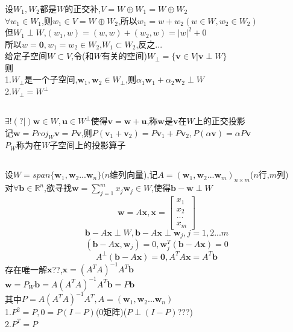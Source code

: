 \documentclass[11pt, a4paper, UTF8]{ctexart}
\begin{document}
\subsubsection{}
设$W_1,W_2$都是$W$的正交补,$V=W\oplus W_1=W\oplus W_2$\\
$\forall w_1\in W_1$,则$w_1\in V=W\oplus W_2$,所以$w_1=w+w_2(w\in W,w_2\in W_2)$\\
但$W_1\perp W$,$(w_1,w)=(w,w)+(w_2,w)=|w|^2+0$\\
所以$w=\bm0,w_1=w_2\in W_2$,$W_1\subset W_2$,反之...\\
给定子空间$W\subset V$,令(和$W$有关的空间)$W_\perp=\{\bm v\in V|\bm v\perp W\}$\\
则\\
1.$W_\perp$是一个子空间,$\bm w_1,\bm w_2\in W_\perp$,则$\alpha_1\bm w_1+\alpha_2\bm w_2\perp W$\\
2.$W_\perp=W^\perp$\\
\subsection{}
$\exists!(?|)\bm w\in W,\bm u\in W^\perp$使得$\bm v=\bm w+\bm u$,称$\bm w$是$\bm v$在$W$上的正交投影\\
记$\bm w=Proj_W\bm v=P\bm v$,则$P(\bm v_1+\bm v_2)=P\bm v_1+P\bm v_2,P(\alpha\bm v)=\alpha P\bm v$\\
$P_W$称为在$W$子空间上的投影算子\\
\subsection{}
设$W=span\{\bm w_1,\bm w_2...\bm w_n\}(n$维列向量),记$A=(\bm w_1,\bm w_2...\bm w_m)_{n\times m}$($n$行,$m$列)\\
对$\forall\bm b\in\mathbb{R}^n$,欲寻找$\bm w=\sum_{j=1}^mx_j\bm w_j\in W$,使得$\bm b-\bm w\perp W$\\
\[\bm w=A\bm x,\bm x=\begin{bmatrix}
x_1\\
x_2\\
...\\
x_m
\end{bmatrix}\]
\[\bm b-A\bm x\perp W,\bm b-A\bm x\perp\bm w_j,j=1,2...m\]
\[(\bm b-A\bm x,\bm w_j)=0,\bm w_j^T(\bm b-A\bm x)=0\]
\[A^\perp(\bm b-A\bm x)=\bm0,A^TA\bm x=A^T\bm b\]
存在唯一解$\bm x$??,$\bm x=(A^TA)^{-1}A^T\bm b$\\
$\bm w=P_W\bm b=A(A^TA)^{-1}A^T\bm b=P\bm b$\\
其中$P=A(A^TA)^{-1}A^T,A=(\bm w_1,\bm w_2...\bm w_n)$\\
1.$P^2=P,0=P(I-P)$(0矩阵)($P\perp(I-P)$???)\\
2.$P^T=P$\\
\end{document}
